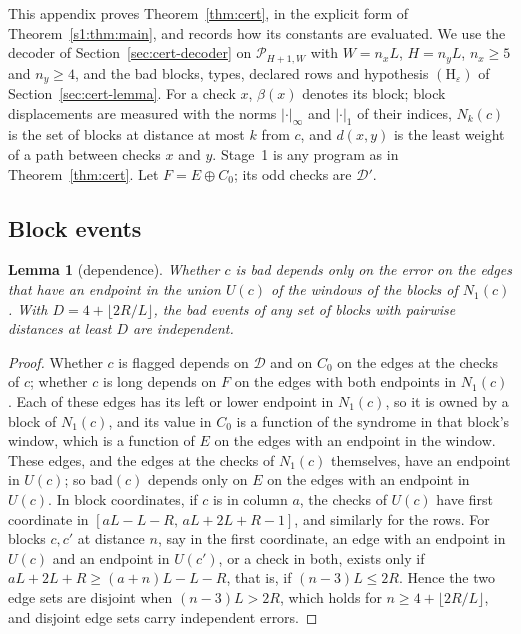 \documentclass[11pt]{amsart}
\newtheorem{lemma}[theorem]{Lemma}
\theoremstyle{definition}
\theoremstyle{remark}
\numberwithin{equation}{section}
\newcommand{\cD}{\mathcal{D}}
\newcommand{\eps}{\varepsilon}
\newcommand{\bad}{\mathrm{bad}}
\begin{document}
This appendix proves Theorem~\ref{thm:cert}, in the explicit form of Theorem~\ref{s1:thm:main}, and records how its constants are evaluated. We use the decoder of Section~\ref{sec:cert-decoder} on $\mathcal P_{H+1,W}$ with $W=n_xL$, $H=n_yL$, $n_x\ge5$ and $n_y\ge4$, and the bad blocks, types, declared rows and hypothesis $(\mathrm H_\eps)$ of Section~\ref{sec:cert-lemma}. For a check $x$, $\beta(x)$ denotes its block; block displacements are measured with the norms $|\cdot|_\infty$ and $|\cdot|_1$ of their indices, $N_k(c)$ is the set of blocks at distance at most $k$ from $c$, and $d(x,y)$ is the least weight of a path between checks $x$ and $y$. Stage~1 is any program as in Theorem~\ref{thm:cert}. Let $F=E\oplus C_0$; its odd checks are $\cD'$.

\subsection{Block events}\label{s1:sec:events}

\begin{lemma}[dependence]\label{s1:lem:dep}
Whether $c$ is bad depends only on the error on the edges that have an endpoint in the union $U(c)$ of the windows of the blocks of $N_1(c)$. With $D=4+\lfloor2R/L\rfloor$, the bad events of any set of blocks with pairwise distances at least $D$ are independent.
\end{lemma}

\begin{proof}
Whether $c$ is flagged depends on $\cD$ and on $C_0$ on the edges at the checks of $c$; whether $c$ is long depends on $F$ on the edges with both endpoints in $N_1(c)$. Each of these edges has its left or lower endpoint in $N_1(c)$, so it is owned by a block of $N_1(c)$, and its value in $C_0$ is a function of the syndrome in that block's window, which is a function of $E$ on the edges with an endpoint in the window. These edges, and the edges at the checks of $N_1(c)$ themselves, have an endpoint in $U(c)$; so $\bad(c)$ depends only on $E$ on the edges with an endpoint in $U(c)$. In block coordinates, if $c$ is in column $a$, the checks of $U(c)$ have first coordinate in $[aL-L-R,\,aL+2L+R-1]$, and similarly for the rows. For blocks $c,c'$ at distance $n$, say in the first coordinate, an edge with an endpoint in $U(c)$ and an endpoint in $U(c')$, or a check in both, exists only if $aL+2L+R\ge(a+n)L-L-R$, that is, if $(n-3)L\le2R$. Hence the two edge sets are disjoint when $(n-3)L>2R$, which holds for $n\ge4+\lfloor2R/L\rfloor$, and disjoint edge sets carry independent errors.
\end{proof}
\end{document}
